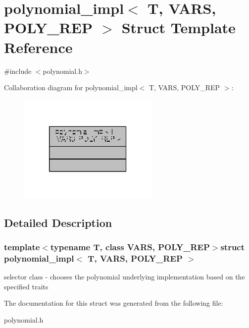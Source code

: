 \hypertarget{structpolynomial__impl}{\section{polynomial\-\_\-impl$<$ T, V\-A\-R\-S, P\-O\-L\-Y\-\_\-\-R\-E\-P $>$ Struct Template Reference}
\label{structpolynomial__impl}
}


{\ttfamily \#include $<$polynomial.\-h$>$}



Collaboration diagram for polynomial\-\_\-impl$<$ T, V\-A\-R\-S, P\-O\-L\-Y\-\_\-\-R\-E\-P $>$\-:
\nopagebreak
\begin{figure}[H]
\begin{center}
\leavevmode
\includegraphics[width=194pt]{structpolynomial__impl__coll__graph}
\end{center}
\end{figure}


\subsection{Detailed Description}
\subsubsection*{template$<$typename T, class V\-A\-R\-S, P\-O\-L\-Y\-\_\-\-R\-E\-P$>$struct polynomial\-\_\-impl$<$ T, V\-A\-R\-S, P\-O\-L\-Y\-\_\-\-R\-E\-P $>$}

selector class -\/ chooses the polynomial underlying implementation based on the specified traits 

The documentation for this struct was generated from the following file\-:\begin{DoxyCompactItemize}
\item 
polynomial.\-h\end{DoxyCompactItemize}
